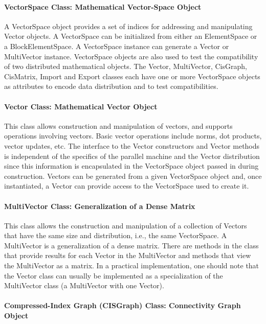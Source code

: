 \documentclass[10pt,relax]{PetraObjectModel}
\begin{document}
\paragraph{VectorSpace Class: Mathematical Vector-Space Object}

A VectorSpace object provides a set of indices for addressing and
manipulating Vector objects. A VectorSpace can be initialized from
either an ElementSpace or a BlockElementSpace.  A VectorSpace
instance can generate a Vector or MultiVector instance.  VectorSpace
objects are also used to test the compatibility of two distributed
mathematical objects. The Vector, MultiVector, CisGraph, CisMatrix,
Import and Export classes each have one or more VectorSpace objects
as attributes to encode data distribution and to test
compatibilities.

\paragraph{Vector Class:  Mathematical Vector Object}

This class allows construction and manipulation of vectors, and
supports operations involving vectors.  Basic vector operations
include norms, dot products, vector updates, etc.  The interface to
the Vector constructors and Vector methods is independent of the
specifics of the parallel machine and the Vector distribution since
this information is encapsulated in the VectorSpace object passed in
during construction.  Vectors can be generated from a given
VectorSpace object and, once instantiated, a Vector can provide
access to the VectorSpace used to create it.

\paragraph{MultiVector Class:  Generalization of a Dense Matrix}

This class allows the construction and manipulation of a collection
of Vectors that have the same size and distribution, i.e., the same
VectorSpace. A MultiVector is a generalization of a dense matrix.
There are methods in the class that provide results for each Vector
in the MultiVector and methods that view the MultiVector as a
matrix. In a practical implementation, one should note that the
Vector class can usually be implemented as a specialization of the
MultiVector class (a MultiVector with one Vector).

\paragraph{Compressed-Index Graph (CISGraph) Class:  Connectivity Graph Object}
\end{document}
